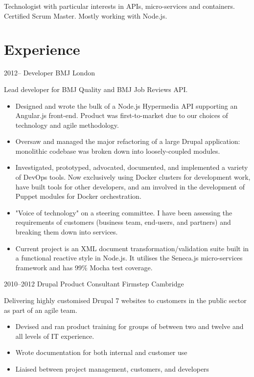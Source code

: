 \documentclass[11pt,a4paper,sans]{moderncv}
\date{11/08/2018}
\begin{document}
\makecvtitle

Technologist with particular interests in APIs, micro-services and containers. Certified Scrum Master. Mostly working with Node.js.

\section{Experience}

\cventry
  {2012--}
  {Developer}
  {BMJ}
  {London}
  {}
  {
    Lead developer for BMJ Quality and BMJ Job Reviews API.
    \begin{itemize}
      \item Designed and wrote the bulk of a Node.js Hypermedia API supporting an Angular.js front-end. Product was first-to-market due to our choices of technology and agile methodology.
      \item Oversaw and managed the major refactoring of a large Drupal application: monolithic codebase was broken down into loosely-coupled modules.
      \item Investigated, prototyped, advocated, documented, and implemented a variety of DevOps tools. Now exclusively using Docker clusters for development work, have built tools for other developers, and am involved in the development of Puppet modules for Docker orchestration.
      \item "Voice of technology" on a steering committee. I have been assessing the requirements of customers (business team, end-users, and partners) and breaking them down into services.
      \item Current project is an XML document transformation/validation suite built in a functional reactive style in Node.js. It utilises the Seneca.js micro-services framework and has 99\% Mocha test coverage.
    \end{itemize}
  }

\cventry
  {2010--2012}
  {Drupal Product Consultant}
  {Firmstep}
  {Cambridge}
  {}
  {
    Delivering highly customised Drupal 7 websites to customers in the public sector as part of an agile team.
    \begin{itemize}
      \item Devised and ran product training for groups of between two and twelve and all levels of IT experience.
      \item Wrote documentation for both internal and customer use
      \item Liaised between project management, customers, and developers
    \end{itemize}
  }
\end{document}
